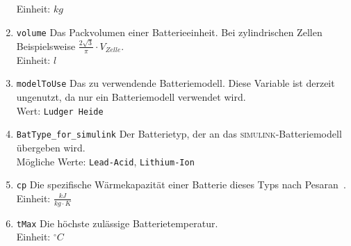 \begin{enumerate}
	Einheit: $kg$
	\item \texttt{volume} Das Packvolumen einer Batterieeinheit. Bei zylindrischen Zellen Beispielsweise $\frac{2\sqrt{3}}{\pi} \cdot V_{Zelle}$.\\
	Einheit: $l$
	\item \texttt{modelToUse} Das zu verwendende Batteriemodell. Diese Variable ist derzeit ungenutzt, da nur ein Batteriemodell verwendet wird.\\
	Wert: \texttt{Ludger Heide}
	\item \texttt{BatType\_for\_simulink} Der Batterietyp, der an das \textsc{simulink}-Batteriemodell übergeben wird.\\
	Mögliche Werte: \texttt{Lead-Acid}, \texttt{Lithium-Ion}
	\item \texttt{cp} Die spezifische Wärmekapazität einer Batterie dieses Typs nach Pesaran~\cite{pesaran2001battery}.\\
	Einheit: $\frac{kJ}{kg\cdot K}$
	\item \texttt{tMax} Die höchste zulässige Batterietemperatur.\\
	Einheit: $^{\circ}C$
\end{enumerate}